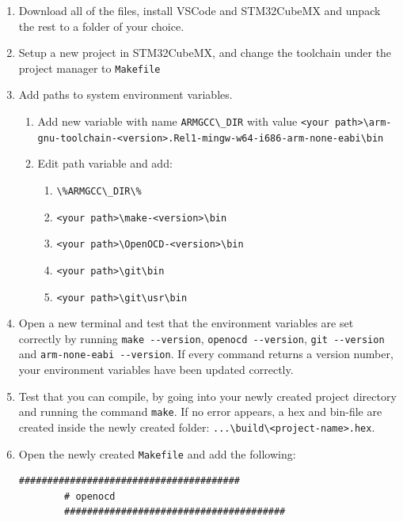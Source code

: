 \begin{appendices}
\begin{enumerate}
    \item Download all of the files, install VSCode and STM32CubeMX and unpack the rest to a folder of your choice.
    \item Setup a new project in STM32CubeMX, and change the toolchain under the project manager to \lstinline[style=bash]{Makefile}
    \item Add paths to system environment variables.
    \begin{enumerate}
        \item Add new variable with name \lstinline[style=bash]{ARMGCC\_DIR} with value \lstinline[style=bash]{<your path>\arm-gnu-toolchain-<version>.Rel1-mingw-w64-i686-arm-none-eabi\bin}
        \item Edit path variable and add:
        \begin{enumerate}
            \item \lstinline[style=bash]{\%ARMGCC\_DIR\%}
            \item \lstinline[style=bash]{<your path>\make-<version>\bin}
            \item \lstinline[style=bash]{<your path>\OpenOCD-<version>\bin}
            \item \lstinline[style=bash]{<your path>\git\bin}
            \item \lstinline[style=bash]{<your path>\git\usr\bin}
        \end{enumerate}
    \end{enumerate}
    \item Open a new terminal and test that the environment variables are set correctly by running \lstinline[style=bash]{make --version}, \lstinline[style=bash]{openocd --version}, \lstinline[style=bash]{git --version} and \lstinline[style=bash]{arm-none-eabi --version}. If every command returns a version number, your environment variables have been updated correctly.
    \item Test that you can compile, by going into your newly created project directory and running the command \lstinline[style=bash]{make}.
    If no error appears, a hex and bin-file are created inside the newly created folder: \lstinline[style=bash]{...\build\<project-name>.hex}.
    \item Open the newly created \lstinline[style=bash]{Makefile} and add the following:
    \begin{lstlisting}[style=bash]
        #######################################
        # openocd
        #######################################

\end{lstlisting}
\end{enumerate}
\end{appendices}
